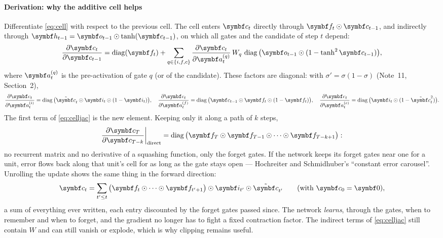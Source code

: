 \documentclass[11pt]{article}
\newcommand{\hv}{\vect{h}}
\newcommand{\av}{\vect{a}}
\newcommand{\cv}{\vect{c}}
\newcommand{\iv}{\vect{i}}
\newcommand{\fv}{\vect{f}}
\newcommand{\ov}{\vect{o}}
\newcommand{\ctil}{\tilde{\vect{c}}}
\newcommand{\diag}{\operatorname{diag}}
\begin{document}
\paragraph{Derivation: why the additive cell helps} Differentiate \eqref{eq:cell} with respect to the previous cell. The
cell enters $\cv_t$ directly through $\fv_t \odot \cv_{t-1}$, and indirectly through $\hv_{t-1} = \ov_{t-1} \odot \tanh(
\cv_{t-1})$, on which all gates and the candidate of step $t$ depend:
\begin{equation}\label{eq:celljac}
  \frac{\partial \cv_t}{\partial \cv_{t-1}} = \diag(\fv_t) + \sum_{q \in \{i, f, c\}}
  \frac{\partial \cv_t}{\partial \av^{(q)}_t}\, W_q\, \diag\big(\ov_{t-1} \odot (1 - \tanh^2\cv_{t-1})\big) ,
\end{equation}
where $\av^{(q)}_t$ is the pre-activation of gate $q$ (or of the candidate). These factors are diagonal: with
$\sigma' = \sigma(1 - \sigma)$ (Note~11, Section~2),
\[
  \frac{\partial\cv_t}{\partial\av^{(i)}_t} = \diag\big(\ctil_t \odot \iv_t \odot (1 - \iv_t)\big), \quad
  \frac{\partial\cv_t}{\partial\av^{(f)}_t} = \diag\big(\cv_{t-1} \odot \fv_t \odot (1 - \fv_t)\big), \quad
  \frac{\partial\cv_t}{\partial\av^{(c)}_t} = \diag\big(\iv_t \odot (1 - \ctil_t^2)\big) .
\]
The first term of \eqref{eq:celljac} is the new element. Keeping
only it along a path of $k$ steps,
\[
  \frac{\partial \cv_T}{\partial \cv_{T-k}}\bigg|_{\text{direct}} = \diag\big(\fv_T \odot \fv_{T-1} \odot \cdots \odot \fv_{T-k+1}\big) :
\]
no recurrent matrix and no derivative of a squashing function, only the forget gates. If the network keeps its forget
gates near one for a unit, error flows back along that unit's cell for as long as the gate stays open --- Hochreiter and
Schmidhuber's ``constant error carousel''. Unrolling the update shows the same thing in the forward direction:
\[
  \cv_t = \sum_{t' \le t} \big(\fv_t \odot \cdots \odot \fv_{t'+1}\big) \odot \iv_{t'} \odot \ctil_{t'}
  \qquad (\text{with } \cv_0 = \vect{0}),
\]
a sum of everything ever written, each entry discounted by the forget gates passed since. The network \emph{learns},
through the gates, when to remember and when to forget, and the gradient no longer has to fight a fixed contraction
factor. The indirect terms of \eqref{eq:celljac} still contain $W$ and can still vanish or explode, which is why clipping
remains useful.
\end{document}
